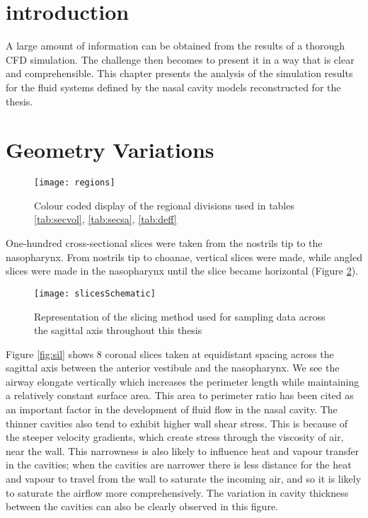 \section{introduction}
A large amount of information can be obtained from the results of a thorough CFD simulation. The challenge then becomes to present it in a way that is clear and comprehensible.
This chapter presents the analysis of the simulation results for the fluid systems defined by the nasal cavity models reconstructed for the thesis.

\section{Geometry Variations}


\begin{figure}
\centering
\texttt{[image: regions]}
\caption{Colour coded display of the regional divisions used in tables \ref{tab:secvol}, \ref{tab:secsa}, \ref{tab:deff}} 
\label{fig:regions}
\end{figure} 

One-hundred cross-sectional slices were taken from the nostrils tip to the nasopharynx. From nostrils tip to choanae, vertical slices were made, while angled slices were made in the nasopharynx until the slice became horizontal (Figure \ref{fig:Slices}).


\begin{figure} 
\centering
\texttt{[image: slicesSchematic]}
\caption{Representation of the slicing method used for sampling data across the sagittal axis throughout this thesis} 
\label{fig:Slices}
\end{figure}

Figure \ref{fig:sil} shows 8 coronal slices taken at equidistant spacing across the sagittal axis between the anterior vestibule and the nasopharynx. We see the airway elongate vertically which increases the perimeter length while maintaining a relatively constant surface area. This area to perimeter ratio has been cited as an important factor in the development of fluid flow in the nasal cavity. The thinner cavities also tend to exhibit higher wall shear stress. This is because of the steeper velocity gradients, which create stress through the viscosity of air, near the wall. This narrowness is also likely to influence heat and vapour transfer in the cavities; when the cavities are narrower there is less distance for the heat and vapour to travel from the wall to saturate the incoming air, and so it is likely to saturate the airflow more comprehensively. The variation in cavity thickness between the cavities can also be clearly observed in this figure.


